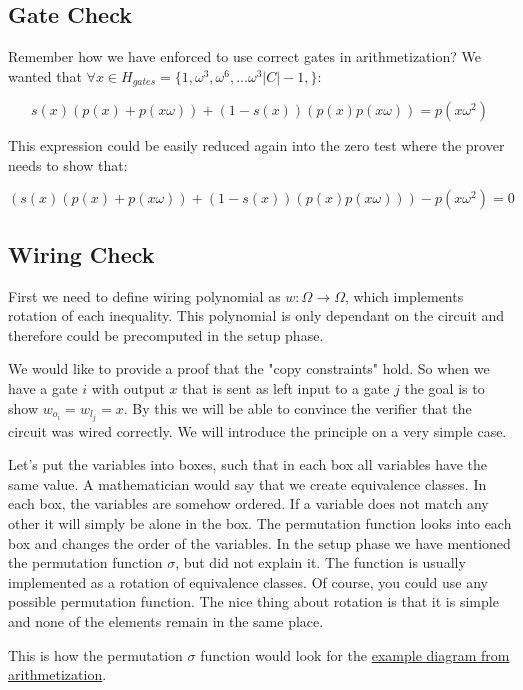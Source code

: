 \subsection{Gate Check}
Remember how we have enforced to use correct gates in arithmetization? We wanted that $\forall x \in H_{gates} = \{1, \omega^3, \omega^6, ... \omega^3{|C| -1},\}$:

$$s(x)(p(x) + p(x\omega)) + (1 - s(x))(p(x)p(x\omega)) = p(x\omega^2)$$

This expression could be easily reduced again into the zero test where the prover needs to show that:

$$(s(x)(p(x) + p(x\omega)) + (1 - s(x))(p(x)p(x\omega))) - p(x\omega^2) = 0$$


\subsection{Wiring Check}
First we need to define wiring polynomial as $w: \Omega \rightarrow \Omega$, which implements rotation of each inequality. This polynomial is only dependant on the circuit and therefore could be precomputed in the setup phase.

We would like to provide a proof that the "copy constraints" hold. So when we have a gate $i$ with output $x$ that is sent as left input to a gate $j$ the goal is to show $w_{o_i} = w_{l_j} = x$. By this we will be able to convince the verifier that the circuit was wired correctly. We will introduce the principle on a very simple case. 

Let's put the variables into boxes, such that in each box all variables have the same value. A mathematician would say that we create equivalence classes. In each box, the variables are somehow ordered. If a variable does not match any other it will simply be alone in the box. The permutation function looks into each box and changes the order of the variables. In the setup phase we have mentioned the permutation function $\sigma$, but did not explain it. The function is usually implemented as a rotation of equivalence classes. Of course, you could use any possible permutation function. The nice thing about rotation is that it is simple and none of the elements remain in the same place.

This is how the permutation $\sigma$ function would look for the  \hyperref[fig:evaluated-circuit]{example diagram from arithmetization}.

